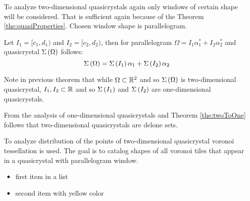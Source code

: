 \documentclass[text.tex]{subfiles}
\begin{document}
To analyze two-dimensional quasicrystals again only windows of certain shape will be considered. That is sufficient again because of the Theorem \ref{the:quasiProperties}. Chosen window shape is parallelogram. 

\begin{theorem}
\label{the:twoToOne}
Let $I_1 = [c_1,d_1)$ and $I_2 = [c_2,d_2)$, then for parallelogram $\Omega = I_1\alpha_1^\ast + I_2\alpha_2^\ast$ and quasicrystal $\Sigma\left(\Omega\right)$ follows: 
$$\Sigma\left(\Omega\right) = \Sigma\left(I_1\right)\alpha_1 + \Sigma\left(I_2\right)\alpha_2$$
\end{theorem}

\begin{remark}
Note in previous theorem that while $\Omega \subset \mathbb{R}^2$ and so $\Sigma\left(\Omega\right)$ is two-dimensional quasicrystal, $I_1, I_2 \subset \mathbb{R}$ and so $\Sigma\left(I_1\right)$ and $\Sigma\left(I_2\right)$ are one-dimensional quasicrystals.
\end{remark}

From the analysis of one-dimensional quasicrystals and Theorem \ref{the:twoToOne} follows that two-dimensional quasicrystals are delone sets.  

To analyze distribution of the points of two-dimensional quasicrystal voronoi tessellation is used. The goal is to catalog shapes of all voronoi tiles that appear in a quasicrystal with parallelogram window. 

\begin{itemize}
\item first item in a list
\item second item with yellow color
\end{itemize}
\end{document}
